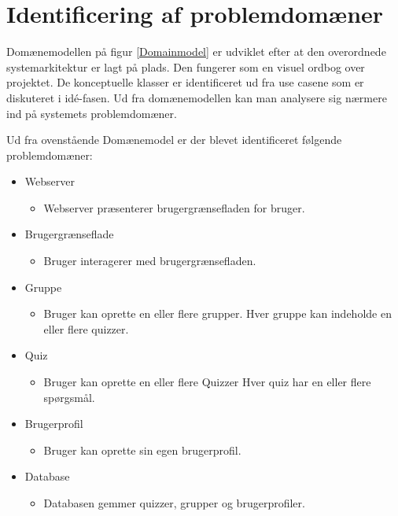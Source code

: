 \chapter{Identificering af problemdomæner}

Domænemodellen på figur \ref{Domainmodel} er udviklet efter at den overordnede systemarkitektur er lagt på plads. Den fungerer som en visuel ordbog over projektet. De konceptuelle klasser er identificeret ud fra use casene som er diskuteret i idé-fasen. Ud fra domænemodellen kan man analysere sig nærmere ind på systemets problemdomæner.


Ud fra ovenstående Domænemodel er der blevet identificeret følgende problemdomæner:

\begin{itemize}
	\item Webserver
	\begin{itemize}
		\item Webserver præsenterer brugergrænsefladen for bruger.
	\end{itemize}
	\item Brugergrænseflade
	\begin{itemize}
		\item Bruger interagerer med brugergrænsefladen.
	\end{itemize}
		\item Gruppe
	\begin{itemize}
		\item Bruger kan oprette en eller flere grupper. Hver gruppe kan indeholde en eller flere quizzer.
	\end{itemize}
		\item Quiz
	\begin{itemize}
		\item Bruger kan oprette en eller flere Quizzer Hver quiz har en eller flere spørgsmål.
	\end{itemize}
		\item Brugerprofil
	\begin{itemize}
		\item Bruger kan oprette sin egen brugerprofil.
	\end{itemize}
	\item Database
	\begin{itemize}
		\item Databasen gemmer quizzer, grupper og brugerprofiler.
	\end{itemize}
\end{itemize}
